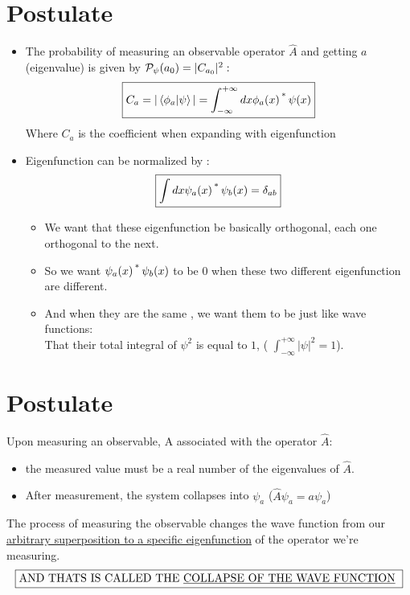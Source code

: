 \documentclass[12pt,oneside]{book}
\begin{document}
\section{Postulate }
\begin{itemize}
	\item The probability of measuring an observable operator $\hat{A}$ and getting $a$ (eigenvalue) is given by $\mathcal{P}_\psi(a_0)=|C_{a_0}|^2 :$
	      \[\boxed{C_a = |\braket{\phi_a|\psi}| =  \int^{+\infty}_{-\infty} dx \phi_a(x)\operatorname{^*}\psi(x) }\]
	      Where $C_a$ is the coefficient when expanding with eigenfunction\\
	\item Eigenfunction can be normalized by :
	      \[\boxed{\int dx \psi_a(x)\operatorname{^*}\psi_b(x) = \delta_{a b}}\]
	      \begin{itemize}
		      \item We want that these eigenfunction be basically orthogonal, each one orthogonal to the next.
		      \item So we want $\psi_a(x)\operatorname{^*}\psi_b(x)$ to be $0$ when these two different eigenfunction are different.
		      \item And when they are the same , we want them to be just like wave functions:\\
		            That their total integral of $\psi^2$ is equal to $1$, ( $\int^{+\infty}_{-\infty}|\psi|^2 =1 $).
	      \end{itemize}
\end{itemize}

\section{Postulate  }
Upon measuring an observable, A associated with the operator $\hat{A}$:
\begin{itemize}
	\item the measured value must be a real number of the eigenvalues of $\hat{A}$.
	\item After measurement, the system collapses into $\psi_a$ ($\hat{A}\psi_a = a\psi_a$)
\end{itemize}
\begin{center}
	The process of measuring the observable changes the wave function from our \underline{arbitrary superposition to a specific eigenfunction} of the operator we're measuring.
	\[\boxed{\text{AND THATS IS CALLED THE  \underline{COLLAPSE OF THE WAVE FUNCTION} }}\]

\end{center}
\end{document}
